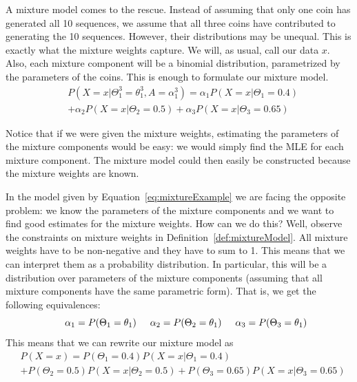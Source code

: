 A mixture model comes to the rescue. Instead of assuming that only one coin has generated all 10 sequences,
we assume that all three coins have contributed to generating the 10 sequences. However, their distributions
may be unequal. This is exactly what the mixture weights capture. We will, as usual, call our data
$ x $. Also, each mixture component will be a binomial distribution, parametrized by the parameters of
the coins. This is enough to formulate our mixture model.
\begin{align}\label{eq:mixtureExample}
&P(X=x|\Theta_{1}^{3}=\theta_{1}^{3}, A = \alpha_{1}^{3}) 
= \alpha_{1}P(X=x|\Theta_{1}=0.4) \\
&+ \alpha_{2}P(X=x|\Theta_{2}=0.5) + \alpha_{3}P(X=x|\Theta_{3}=0.65) \nonumber
\end{align}

Notice that if we were given the mixture weights, estimating
the parameters of the mixture components would be easy: we would simply find the MLE for each mixture component. The mixture
model could then easily be constructed because the mixture weights are known. 

In the model given by Equation~\eqref{eq:mixtureExample} we are facing the opposite problem: we know the parameters of the
mixture components and we want to find good estimates for the mixture weights. How can we do this? Well, observe the constraints
on mixture weights in Definition~\ref{def:mixtureModel}. All mixture weights have to be non-negative and they have to sum to 1.
This means that we can interpret them as a probability distribution. In particular, this will be a distribution over parameters
of the mixture components (assuming that all mixture components have the same parametric form). That is, we get the following
equivalences:
\begin{equation}
\hskip 0.5cm \alpha_{1} = P(\Theta_{1} = \theta_{1}) \hskip 0.5cm \alpha_{2} = P(\Theta_{2} = \theta_{1}) \hskip 0.5cm \alpha_{3} = P(\Theta_{3} = \theta_{1})
\end{equation}
This means that we can rewrite our mixture model as
\begin{align} \label{eq:probabilisticMixtureModel}
&P(X=x) 
= P(\Theta_{1} = 0.4)P(X=x|\Theta_{1}=0.4) \\
&+ P(\Theta_{2} = 0.5)P(X=x|\Theta_{2}=0.5) + P(\Theta_{3} = 0.65)P(X=x|\Theta_{3}=0.65) \nonumber
\end{align}

